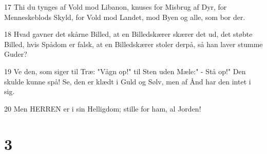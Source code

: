 \par 17 Thi du tynges af Vold mod Libanon, knuses for Misbrug af Dyr, for Menneskeblods Skyld, for Vold mod Landet, mod Byen og alle, som bor der.
\par 18 Hvad gavner det skårne Billed, at en Billedskærer skærer det ud, det støbte Billed, hvis Spådom er falsk, at en Billedskærer stoler derpå, så han laver stumme Guder?
\par 19 Ve den, som siger til Træ: "Vågn op!" til Sten uden Mæle:" - Stå op!" Den skulde kunne spå! Se, den er klædt i Guld og Sølv, men af Ånd har den intet i sig.
\par 20 Men HERREN er i sin Helligdom; stille for ham, al Jorden!

\chapter{3}

